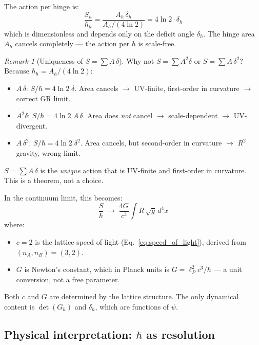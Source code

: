 \documentclass[12pt]{article}
\theoremstyle{remark}
\newtheorem{remark}[theorem]{Remark}
\theoremstyle{definition}
\begin{document}
The action per hinge is:
\begin{equation}
\frac{S_h}{\hbar_h} = \frac{A_h\,\delta_h}{A_h/(4\ln 2)} = 4\ln 2 \cdot \delta_h
\end{equation}
which is dimensionless and depends only on the deficit angle $\delta_h$. The hinge area $A_h$ cancels completely --- the action per $\hbar$ is scale-free.

\begin{remark}[Uniqueness of $S = \sum A\,\delta$]
Why not $S = \sum A^2\delta$ or $S = \sum A\,\delta^2$? Because $\hbar_h = A_h/(4\ln 2)$:
\begin{itemize}
\item $A\,\delta$: $S/\hbar = 4\ln 2\;\delta$. Area cancels $\to$ UV-finite, first-order in curvature $\to$ correct GR limit. \checkmark
\item $A^2\delta$: $S/\hbar = 4\ln 2\;A\,\delta$. Area does \emph{not} cancel $\to$ scale-dependent $\to$ UV-divergent. 
\item $A\,\delta^2$: $S/\hbar = 4\ln 2\;\delta^2$. Area cancels, but second-order in curvature $\to$ $R^2$ gravity, wrong limit. 
\end{itemize}
$S = \sum A\,\delta$ is the \emph{unique} action that is UV-finite and first-order in curvature. This is a theorem, not a choice.
\end{remark}

In the continuum limit, this becomes:
\begin{equation}
\frac{S}{\hbar} \;\to\; \frac{4G}{c^3}\int R\,\sqrt{g}\,d^4x
\end{equation}
where:
\begin{itemize}
\item $c = 2$ is the lattice speed of light (Eq.~\ref{eq:speed_of_light}), derived from $(n_A, n_B) = (3, 2)$.
\item $G$ is Newton's constant, which in Planck units is $G = \ell_P^2 c^3/\hbar$ --- a unit conversion, not a free parameter.
\end{itemize}

Both $c$ and $G$ are determined by the lattice structure. The only dynamical content is $\det(G_h)$ and $\delta_h$, which are functions of $\psi$.

\subsection{Physical interpretation: $\hbar$ as resolution}
\end{document}
